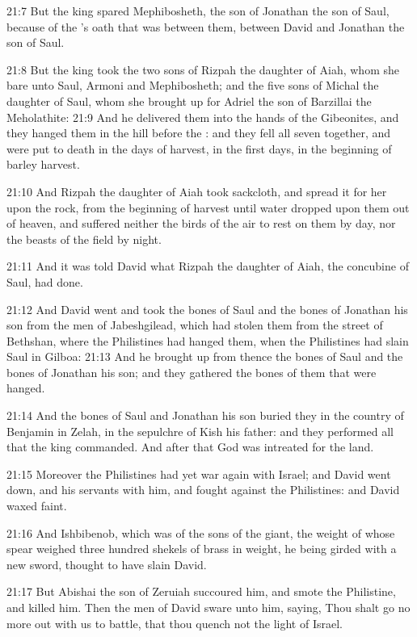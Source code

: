 21:7 But the king spared Mephibosheth, the son of Jonathan the son of Saul, because of the \LORD's oath that was between them, between David and Jonathan the son of Saul.

21:8 But the king took the two sons of Rizpah the daughter of Aiah, whom she bare unto Saul, Armoni and Mephibosheth; and the five sons of Michal the daughter of Saul, whom she brought up for Adriel the son of Barzillai the Meholathite: 21:9 And he delivered them into the hands of the Gibeonites, and they hanged them in the hill before the \LORD: and they fell all seven together, and were put to death in the days of harvest, in the first days, in the beginning of barley harvest.

21:10 And Rizpah the daughter of Aiah took sackcloth, and spread it for her upon the rock, from the beginning of harvest until water dropped upon them out of heaven, and suffered neither the birds of the air to rest on them by day, nor the beasts of the field by night.

21:11 And it was told David what Rizpah the daughter of Aiah, the concubine of Saul, had done.

21:12 And David went and took the bones of Saul and the bones of Jonathan his son from the men of Jabeshgilead, which had stolen them from the street of Bethshan, where the Philistines had hanged them, when the Philistines had slain Saul in Gilboa: 21:13 And he brought up from thence the bones of Saul and the bones of Jonathan his son; and they gathered the bones of them that were hanged.

21:14 And the bones of Saul and Jonathan his son buried they in the country of Benjamin in Zelah, in the sepulchre of Kish his father: and they performed all that the king commanded. And after that God was intreated for the land.

21:15 Moreover the Philistines had yet war again with Israel; and David went down, and his servants with him, and fought against the Philistines: and David waxed faint.

21:16 And Ishbibenob, which was of the sons of the giant, the weight of whose spear weighed three hundred shekels of brass in weight, he being girded with a new sword, thought to have slain David.

21:17 But Abishai the son of Zeruiah succoured him, and smote the Philistine, and killed him. Then the men of David sware unto him, saying, Thou shalt go no more out with us to battle, that thou quench not the light of Israel.

